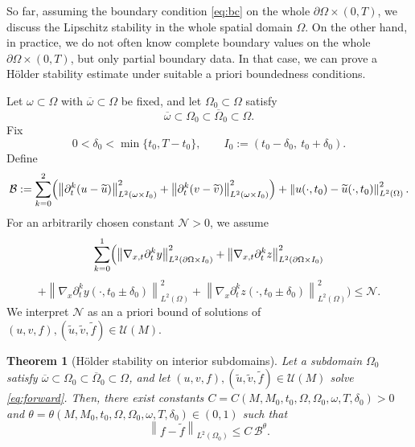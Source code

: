 \documentclass[12pt]{amsart}
\theoremstyle{plain}
\newtheorem{theorem}{Theorem}[section]
\theoremstyle{definition}
\theoremstyle{remark}
\newcommand{\p}{\partial}
\newcommand{\ppp}{\partial}
\newcommand{\OOO}{\Omega}
\newcommand{\norm}[1]{\left\lVert#1\right\rVert}
\newcommand{\Om}{\Omega}
\begin{document}
So far, assuming the boundary condition \eqref{eq:bc} on the whole 
$\ppp\OOO \times 
(0,T)$, we discuss the Lipschitz stability in the whole spatial 
domain $\OOO$. 
On the other hand, in practice, we do not often know complete 
boundary values on the whole $\ppp\OOO \times (0,T)$, 
but only partial boundary data. In that case, we can prove a H\"older stability estimate under suitable a priori boundedness conditions.


Let $\omega\subset\Omega$ with $\overline{\omega}\subset\Omega$ be fixed, and let
$\Omega_0\subset\Omega$ satisfy
\[
\overline{\omega}\subset\Omega_0\subset\overline{\Omega}_0\subset\Omega.
\]
Fix
\[
0<\delta_0<\min\{t_0,T-t_0\},
\qquad
I_0:=(t_0-\delta_0,\ t_0+\delta_0).
\]
Define
\begin{equation}\label{eq:B-def}
\mathcal{B}:=\sum_{k=0}^2\Bigl(
\norm{\p_t^k(u-\widetilde u)}_{L^2(\omega\times I_0)}^2
+\norm{\p_t^k(v-\widetilde v)}_{L^2(\omega\times I_0)}^2\Bigr)
+\norm{u(\cdot,t_0)-\widetilde u(\cdot,t_0)}_{L^2(\Om)}^2.
\end{equation}
For an arbitrarily chosen constant $\mathcal{N}>0$, we assume 
\begin{equation}\label{eq:N-def}
\sum_{k=0}^1\Bigl(
\norm{\nabla_{x,t}\p_t^k y}_{L^2(\p\Om\times I_0)}^2
+\norm{\nabla_{x,t}\p_t^k z}_{L^2(\p\Om\times I_0)}^2
\end{equation}
$$
+\norm{\nabla_x\p_t^k y(\cdot,t_0\pm\delta_0)}_{L^2(\Om)}^2
+\norm{\nabla_x\p_t^k z(\cdot,t_0\pm\delta_0)}_{L^2(\Om)}^2
\Bigr) \le \mathcal{N}.
$$
We interpret $\mathcal{N}$ as an a priori bound of solutions of $(u,v,f),
(\widetilde u,\widetilde v,\widetilde f)\in\mathcal{U}(M)$.

\begin{theorem}[H\"older stability on interior subdomains]
\label{thm:holder}
Let a subdomain $\Om_0$ satisfy 
$\overline\omega\subset\Om_0\subset\overline{\Om}_0\subset\Om$,
and let $(u,v,f),(\widetilde u,\widetilde v,\widetilde f)\in\mathcal{U}(M)$
solve \eqref{eq:forward}. 
Then, there exist constants
$C=C(M,M_0,t_0,\Om,\Om_0,\omega,T,\delta_0)>0$ and
$\theta=\theta(M,M_0,t_0,\Om,\Om_0,\omega,T,\delta_0)\in(0,1)$ such that
\begin{equation}\label{eq:stab-holder}
\norm{f-\tilde f}_{L^2(\Om_0)}\le C\,\mathcal{B}^{\theta}.
\end{equation}
\end{theorem}
\end{document}
